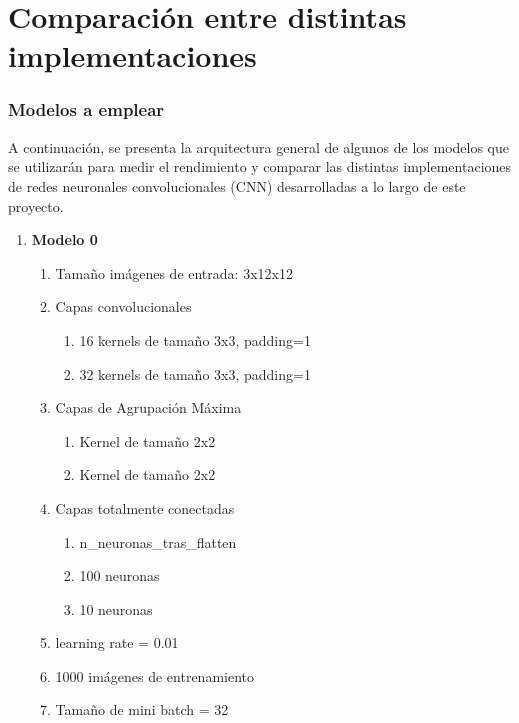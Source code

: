 \chapter{Comparación entre distintas implementaciones}

\subsection{Modelos a emplear}

A continuación, se presenta la arquitectura general de algunos de los modelos que se utilizarán para medir el rendimiento y comparar las distintas implementaciones de redes neuronales convolucionales (CNN) desarrolladas a lo largo de este proyecto.

\begin{enumerate}
	\item \textbf{Modelo 0}
	\begin{enumerate}[label=\textbullet, nosep]
		\item Tamaño imágenes de entrada: 3x12x12
		\item Capas convolucionales
		\begin{enumerate}[label=\textbullet, nosep]
			\item 16 kernels de tamaño 3x3, padding=1
			\item 32 kernels de tamaño 3x3, padding=1
		\end{enumerate}
		\item Capas de Agrupación Máxima
		\begin{enumerate}[label=\textbullet, nosep]
			\item Kernel de tamaño 2x2
			\item Kernel de tamaño 2x2
		\end{enumerate}
		\item Capas totalmente conectadas
		\begin{enumerate}[label=\textbullet, nosep]
			\item n\_neuronas\_tras\_flatten
			\item 100 neuronas
			\item 10 neuronas
		\end{enumerate}
		\item learning rate = 0.01
		\item 1000 imágenes de entrenamiento
		\item Tamaño de mini batch = 32
	\end{enumerate}
	

\end{enumerate}
